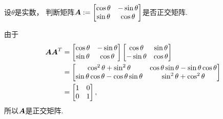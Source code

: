 \begin{example}%
设\(\theta\)是实数，
判断矩阵\(
	\boldsymbol{A} := \begin{bmatrix}
		\cos\theta & -\sin\theta \\
		\sin\theta & \cos\theta
	\end{bmatrix}
\)是否正交矩阵.
\begin{solution}
由于\begin{align*}
	\boldsymbol{A} \boldsymbol{A}^T
	&= \begin{bmatrix}
		\cos\theta & -\sin\theta \\
		\sin\theta & \cos\theta
	\end{bmatrix}
	\begin{bmatrix}
		\cos\theta & \sin\theta \\
		-\sin\theta & \cos\theta
	\end{bmatrix} \\
	&= \begin{bmatrix}
		\cos^2\theta + \sin^2\theta & \cos\theta \sin\theta - \sin\theta \cos\theta \\
		\sin\theta \cos\theta - \cos\theta \sin\theta & \sin^2\theta + \cos^2\theta
	\end{bmatrix} \\
	&= \begin{bmatrix}
		1 & 0 \\
		0 & 1
	\end{bmatrix},
\end{align*}
所以\(\boldsymbol{A}\)是正交矩阵.
\end{solution}
\end{example}


